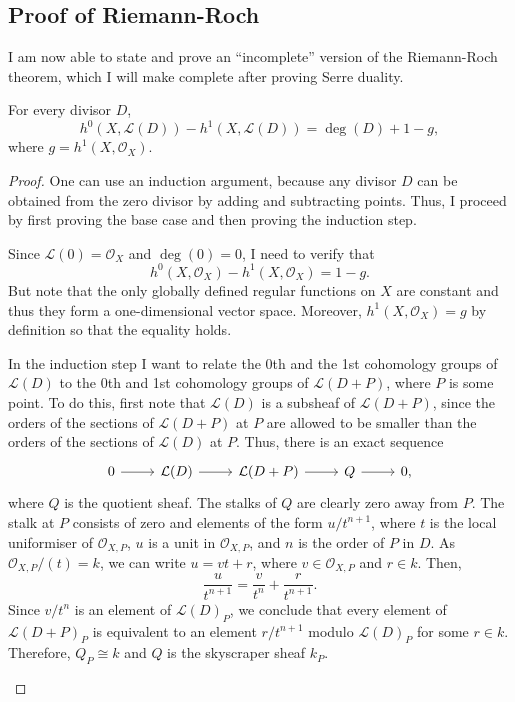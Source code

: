 \subsection{Proof of Riemann-Roch}
I am now able to state and prove an ``incomplete'' version of the
Riemann-Roch theorem, which I will make complete after proving Serre
duality.

\begin{thm}
  \label{thm:riemann_roch_cohomology}
  For every divisor $D$,
  \[
    h^{0}(X, \mathcal{L}(D))-h^{1}(X, \mathcal{L}(D))=\deg(D)+1-g,
  \]
  where $g=h^{1}(X, \mathscr{O}_{X})$.
\end{thm}
\begin{proof}
  One can use an induction argument, because any divisor $D$ can be
  obtained from the zero divisor by adding and subtracting points.
  Thus, I proceed by first proving the base case and then proving
  the induction step.

  \begin{description}[style=nextline]
    \item[base case$\big)$]
          Since $\mathcal{L}(0)=\mathscr{O}_{X}$ and $\deg(0)=0$,
          I need to verify that
          \[h^{0}(X, \mathscr{O}_{X})-h^{1}(X, \mathscr{O}_{X})=1-g.\]
          But note that the only globally defined regular functions
          on $X$ are constant and thus they form a one-dimensional vector
          space. Moreover, $h^{1}(X, \mathscr{O}_{X})=g$ by definition
          so that the equality holds.
    \item[induction step$\big)$]
          In the induction step I want to relate the 0th and the 1st
          cohomology groups of $\mathcal{L}(D)$ to the 0th and
          1st cohomology groups of $\mathcal{L}(D+P)$, where
          $P$ is some point. To do this, first note that
          $\mathcal{L}(D)$ is a subsheaf of $\mathcal{L}(D+P)$, since
          the orders of the sections of $\mathcal{L}(D+P)$ at $P$ are
          allowed to be smaller than the orders of the sections of
          $\mathcal{L}(D)$ at $P$. Thus, there is an exact sequence
          \[
          \begin{tikzcd}
            0\arrow{r} & \mathcal{L}(D)\arrow{r} & \mathcal{L}(D+P)\arrow{r}
            & Q\arrow{r} & 0,
          \end{tikzcd}
          \]
          where $Q$ is the quotient sheaf. The stalks of $Q$ are clearly
          zero away from $P$. The stalk at $P$ consists of zero and
          elements of the form $u/t^{n+1}$, where $t$ is the local
          uniformiser of $\mathscr{O}_{X,P}$, $u$ is a unit in
          $\mathcal{O}_{X,P}$, and $n$ is the order of $P$ in $D$.
          As $\mathcal{O}_{X,P}/(t)=k$, we can write $u=vt+r$,
          where $v\in\mathcal{O}_{X,P}$ and $r\in k$.
          Then,
          \[\frac{u}{t^{n+1}}=\frac{v}{t^n}+\frac{r}{t^{n+1}}.\]
          Since $v/t^n$ is an element of $\mathcal{L}(D)_{P}$, we conclude
          that every element of $\mathcal{L}(D+P)_{P}$ is equivalent to
          an element $r/t^{n+1}$ modulo $\mathcal{L}(D)_{P}$ for some
          $r\in k$. Therefore, $Q_{P}\cong k$ and $Q$ is the skyscraper sheaf
          $k_{P}$.


\end{description}
\end{proof}
